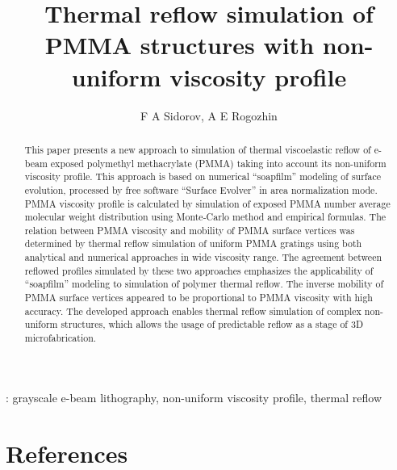 \documentclass[12pt]{iopart}
\begin{document}
	
\title{Thermal reflow simulation of PMMA structures with non-uniform viscosity profile}
\author{F A Sidorov, A E Rogozhin}
\address{Valiev Institute of Physics and Technology, Russian Academy of Sciences, Moscow, 117218 Russia}

\vspace{10pt}

\begin{abstract}
This paper presents a new approach to simulation of thermal viscoelastic reflow of e-beam exposed polymethyl methacrylate (PMMA) taking into account its non-uniform viscosity profile.
This approach is based on numerical ``soapfilm'' modeling of surface evolution, processed by free software ``Surface Evolver'' in area normalization mode.
PMMA viscosity profile is calculated by simulation of exposed PMMA number average molecular weight distribution using Monte-Carlo method and empirical formulas.
The relation between PMMA viscosity and mobility of PMMA surface vertices was determined by thermal reflow simulation of uniform PMMA gratings using both analytical and numerical approaches in wide viscosity range.
The agreement between reflowed profiles simulated by these two approaches emphasizes the applicability of ``soapfilm'' modeling to simulation of polymer thermal reflow. 
The inverse mobility of PMMA surface vertices appeared to be proportional to PMMA viscosity with high accuracy.
The developed approach enables thermal reflow simulation of complex non-uniform structures, which allows the usage of predictable reflow as a stage of 3D microfabrication.
\end{abstract}

\vspace{2pc}

: grayscale e-beam lithography, non-uniform viscosity profile, thermal reflow






\section*{References}

	
\end{document}
